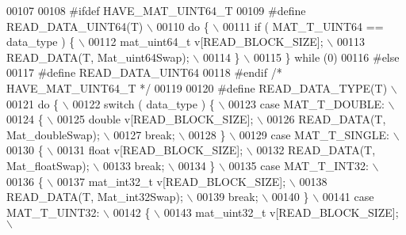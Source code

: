 \begin{DoxyCode}
00107 
00108 \textcolor{preprocessor}{#ifdef HAVE\_MAT\_UINT64\_T}
00109 \textcolor{preprocessor}{#define READ\_DATA\_UINT64(T) \(\backslash\)}
00110 \textcolor{preprocessor}{    do \{ \(\backslash\)}
00111 \textcolor{preprocessor}{        if ( MAT\_T\_UINT64 == data\_type ) \{ \(\backslash\)}
00112 \textcolor{preprocessor}{            mat\_uint64\_t v[READ\_BLOCK\_SIZE]; \(\backslash\)}
00113 \textcolor{preprocessor}{            READ\_DATA(T, Mat\_uint64Swap); \(\backslash\)}
00114 \textcolor{preprocessor}{        \} \(\backslash\)}
00115 \textcolor{preprocessor}{    \} while (0)}
00116 \textcolor{preprocessor}{#else}
00117 \textcolor{preprocessor}{#define READ\_DATA\_UINT64}
00118 \textcolor{preprocessor}{#endif }\textcolor{comment}{/* HAVE\_MAT\_UINT64\_T */}\textcolor{preprocessor}{}
00119 
00120 \textcolor{preprocessor}{#define READ\_DATA\_TYPE(T) \(\backslash\)}
00121 \textcolor{preprocessor}{    do \{ \(\backslash\)}
00122 \textcolor{preprocessor}{        switch ( data\_type ) \{ \(\backslash\)}
00123 \textcolor{preprocessor}{            case MAT\_T\_DOUBLE: \(\backslash\)}
00124 \textcolor{preprocessor}{            \{ \(\backslash\)}
00125 \textcolor{preprocessor}{                double v[READ\_BLOCK\_SIZE]; \(\backslash\)}
00126 \textcolor{preprocessor}{                READ\_DATA(T, Mat\_doubleSwap); \(\backslash\)}
00127 \textcolor{preprocessor}{                break; \(\backslash\)}
00128 \textcolor{preprocessor}{            \} \(\backslash\)}
00129 \textcolor{preprocessor}{            case MAT\_T\_SINGLE: \(\backslash\)}
00130 \textcolor{preprocessor}{            \{ \(\backslash\)}
00131 \textcolor{preprocessor}{                float v[READ\_BLOCK\_SIZE]; \(\backslash\)}
00132 \textcolor{preprocessor}{                READ\_DATA(T, Mat\_floatSwap); \(\backslash\)}
00133 \textcolor{preprocessor}{                break; \(\backslash\)}
00134 \textcolor{preprocessor}{            \} \(\backslash\)}
00135 \textcolor{preprocessor}{            case MAT\_T\_INT32: \(\backslash\)}
00136 \textcolor{preprocessor}{            \{ \(\backslash\)}
00137 \textcolor{preprocessor}{                mat\_int32\_t v[READ\_BLOCK\_SIZE]; \(\backslash\)}
00138 \textcolor{preprocessor}{                READ\_DATA(T, Mat\_int32Swap); \(\backslash\)}
00139 \textcolor{preprocessor}{                break; \(\backslash\)}
00140 \textcolor{preprocessor}{            \} \(\backslash\)}
00141 \textcolor{preprocessor}{            case MAT\_T\_UINT32: \(\backslash\)}
00142 \textcolor{preprocessor}{            \{ \(\backslash\)}
00143 \textcolor{preprocessor}{                mat\_uint32\_t v[READ\_BLOCK\_SIZE]; \(\backslash\)}

\end{DoxyCode}
